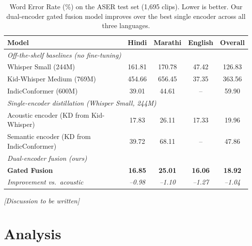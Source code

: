 \documentclass{article} %
\begin{document}
\begin{table}[t]
\caption{Word Error Rate (\%) on the ASER test set (1,695 clips). Lower is better. Our dual-encoder gated fusion model improves over the best single encoder across all three languages.}
\label{tab:main_results}
\begin{center}
\begin{tabular}{lcccc}
\toprule
\textbf{Model} & \textbf{Hindi} & \textbf{Marathi} & \textbf{English} & \textbf{Overall} \\
\midrule
\multicolumn{5}{l}{\textit{Off-the-shelf baselines (no fine-tuning)}} \\
Whisper Small (244M) & 161.81 & 170.78 & 47.42 & 126.83 \\
Kid-Whisper Medium (769M) & 454.66 & 656.45 & 37.35 & 363.56 \\
IndicConformer (600M) & 39.01 & 44.61 & -- & 59.90 \\
\midrule
\multicolumn{5}{l}{\textit{Single-encoder distillation (Whisper Small, 244M)}} \\
Acoustic encoder (KD from Kid-Whisper) & 17.83 & 26.11 & 17.33 & 19.96 \\
Semantic encoder (KD from IndicConformer) & 39.72 & 68.11 & -- & 47.86 \\
\midrule
\multicolumn{5}{l}{\textit{Dual-encoder fusion (ours)}} \\
\textbf{Gated Fusion} & \textbf{16.85} & \textbf{25.01} & \textbf{16.06} & \textbf{18.92} \\
\quad \textit{Improvement vs.\ acoustic} & \textit{--0.98} & \textit{--1.10} & \textit{--1.27} & \textit{--1.04} \\
\bottomrule
\end{tabular}
\end{center}
\end{table}

\textit{[Discussion to be written]}

\section{Analysis}
\label{sec:analysis}
\end{document}

